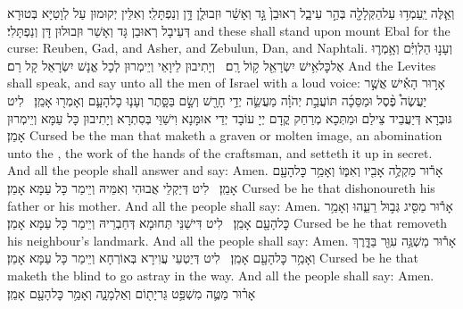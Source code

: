 {וְאֵ֛לֶּה יַֽעַמְד֥וּ עַל\maqqaf הַקְּלָלָ֖ה בְּהַ֣ר עֵיבָ֑ל רְאוּבֵן֙ גָּ֣ד וְאָשֵׁ֔ר וּזְבוּלֻ֖ן דָּ֥ן וְנַפְתָּלִֽי׃}
{וְאִלֵּין יְקוּמוּן עַל לְוָטַיָּא בְּטוּרָא דְּעֵיבָל רְאוּבֵן גָּד וְאָשֵׁר וּזְבוּלוּן דָּן וְנַפְתָּלִי׃}
{and these shall stand upon mount Ebal for the curse: Reuben, Gad, and Asher, and Zebulun, Dan, and Naphtali.}{}
{וְעָנ֣וּ הַלְוִיִּ֗ם וְאָ֥מְר֛וּ אֶל\maqqaf כׇּל\maqqaf אִ֥ישׁ יִשְׂרָאֵ֖ל ק֥וֹל רָֽם׃ \setuma }
{וְיָתִיבוּן לֵיוָאֵי וְיֵימְרוּן לְכָל אֱנָשׁ יִשְׂרָאֵל קָל רַם׃}
{And the Levites shall speak, and say unto all the men of Israel with a loud voice:}{}
{אָר֣וּר הָאִ֡ישׁ אֲשֶׁ֣ר יַעֲשֶׂה֩ פֶ֨סֶל וּמַסֵּכָ֜ה תּוֹעֲבַ֣ת יְהֹוָ֗ה מַעֲשֵׂ֛ה יְדֵ֥י חָרָ֖שׁ וְשָׂ֣ם בַּסָּ֑תֶר וְעָנ֧וּ כׇל\maqqaf הָעָ֛ם וְאָמְר֖וּ אָמֵֽן׃ \setuma }
{לִיט גּוּבְרָא דְּיַעֲבֵיד צֵילַם וּמַתְּכָא מְרַחַק קֳדָם יְיָ עוֹבָד יְדֵי אוּמָּנָא וִישַׁוֵּי בְּסִתְרָא וְיָתִיבוּן כָּל עַמָּא וְיֵימְרוּן אָמֵן׃}
{Cursed be the man that maketh a graven or molten image, an abomination unto the \lord, the work of the hands of the craftsman, and setteth it up in secret. And all the people shall answer and say: Amen.}{}
{אָר֕וּר מַקְלֶ֥ה אָבִ֖יו וְאִמּ֑וֹ וְאָמַ֥ר כׇּל\maqqaf הָעָ֖ם אָמֵֽן׃ \setuma }
{לִיט דְּיַקְלֵי אֲבוּהִי וְאִמֵּיהּ וְיֵימַר כָּל עַמָּא אָמֵן׃}
{Cursed be he that dishonoureth his father or his mother. And all the people shall say: Amen.}{}
{אָר֕וּר מַסִּ֖יג גְּב֣וּל רֵעֵ֑הוּ וְאָמַ֥ר כׇּל\maqqaf הָעָ֖ם אָמֵֽן׃ \setuma }
{לִיט דִּישַׁנֵּי תְּחוּמָא דְּחַבְרֵיהּ וְיֵימַר כָּל עַמָּא אָמֵן׃}
{Cursed be he that removeth his neighbour’s landmark. And all the people shall say: Amen.}{}
{אָר֕וּר מַשְׁגֶּ֥ה עִוֵּ֖ר בַּדָּ֑רֶךְ וְאָמַ֥ר כׇּל\maqqaf הָעָ֖ם אָמֵֽן׃ \setuma }
{לִיט דְּיַטְעֵי עֲוִירָא בְּאוֹרְחָא וְיֵימַר כָּל עַמָּא אָמֵן׃}
{Cursed be he that maketh the blind to go astray in the way. And all the people shall say: Amen.}{}
{אָר֗וּר מַטֶּ֛ה מִשְׁפַּ֥ט גֵּר\maqqaf יָת֖וֹם וְאַלְמָנָ֑ה וְאָמַ֥ר כׇּל\maqqaf הָעָ֖ם אָמֵֽן׃}
